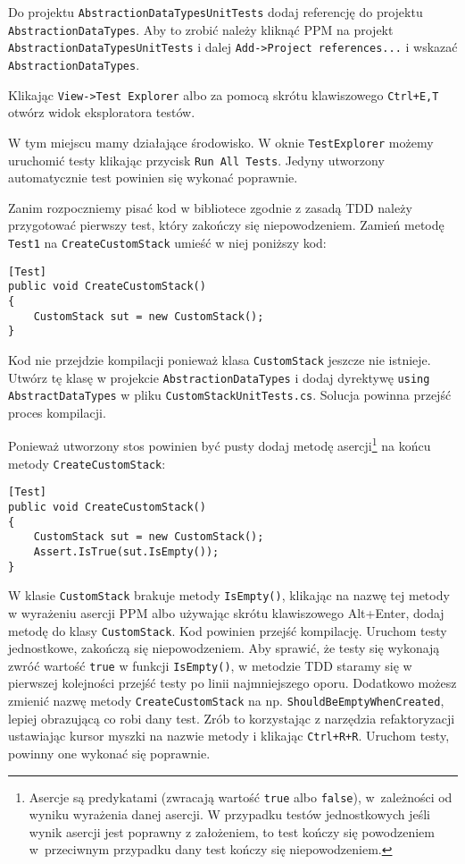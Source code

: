 Do projektu \texttt{AbstractionDataTypesUnitTests} dodaj referencję do projektu \texttt{AbstractionDataTypes}. Aby to zrobić należy kliknąć PPM na projekt \texttt{AbstractionDataTypesUnitTests} i dalej \texttt{Add->Project references...} i wskazać \texttt{AbstractionDataTypes}. 

Klikając \texttt{View->Test Explorer} albo za pomocą skrótu klawiszowego \texttt{Ctrl+E,T} otwórz widok eksploratora testów. 

W tym miejscu mamy działające środowisko. W oknie \texttt{TestExplorer} możemy uruchomić testy klikając przycisk \texttt{Run All Tests}. Jedyny utworzony automatycznie test powinien się wykonać poprawnie.

Zanim rozpoczniemy pisać kod w bibliotece zgodnie z zasadą TDD należy przygotować pierwszy test, który zakończy się niepowodzeniem. Zamień metodę \texttt{Test1} na \texttt{CreateCustomStack} umieść w niej poniższy kod:
\begin{lstlisting}
[Test]
public void CreateCustomStack()
{
	CustomStack sut = new CustomStack();
}
\end{lstlisting}
Kod nie przejdzie kompilacji ponieważ klasa \texttt{CustomStack} jeszcze nie istnieje. Utwórz tę klasę w projekcie \texttt{AbstractionDataTypes} i dodaj dyrektywę \texttt{using AbstractDataTypes} w pliku \texttt{CustomStackUnitTests.cs}. Solucja powinna przejść proces kompilacji.

Ponieważ utworzony stos powinien być pusty dodaj metodę asercji\footnote{Asercje są predykatami (zwracają wartość \texttt{true} albo \texttt{false}), w~zależności od wyniku wyrażenia danej asercji. W przypadku testów jednostkowych jeśli wynik asercji jest poprawny z założeniem, to test kończy się powodzeniem w~przeciwnym przypadku dany test kończy się niepowodzeniem.} na końcu metody \texttt{CreateCustomStack}:
\begin{lstlisting}
[Test]
public void CreateCustomStack()
{
	CustomStack sut = new CustomStack();
	Assert.IsTrue(sut.IsEmpty());
}
\end{lstlisting}
W klasie \texttt{CustomStack} brakuje metody \texttt{IsEmpty()}, klikając na nazwę tej metody w wyrażeniu asercji PPM albo używając skrótu klawiszowego Alt+Enter, dodaj metodę do klasy \texttt{CustomStack}. Kod powinien przejść kompilację. Uruchom testy jednostkowe, zakończą się niepowodzeniem. Aby sprawić, że testy się wykonają zwróć wartość \texttt{true} w funkcji \texttt{IsEmpty()}, w metodzie TDD staramy się w pierwszej kolejności przejść testy po linii najmniejszego oporu. Dodatkowo możesz zmienić nazwę metody \texttt{CreateCustomStack} na np. \texttt{ShouldBeEmptyWhenCreated}, lepiej obrazującą co robi dany test. Zrób to korzystając z narzędzia refaktoryzacji ustawiając kursor myszki na nazwie metody i klikając \texttt{Ctrl+R+R}. Uruchom testy, powinny one wykonać się poprawnie.

